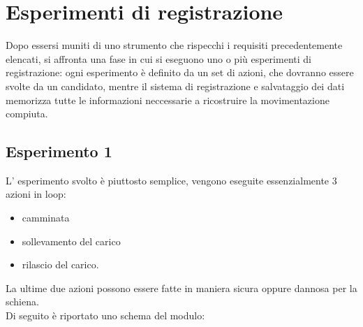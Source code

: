 \documentclass[a4paper, oneside]{book}
\begin{document}
	\section{Esperimenti di registrazione}
Dopo essersi muniti di uno strumento che rispecchi i requisiti precedentemente elencati, si  affronta una fase in cui si eseguono uno o più esperimenti di registrazione: ogni esperimento è definito da un set di azioni, che dovranno essere svolte da un candidato, mentre il sistema di registrazione e salvataggio dei dati memorizza tutte le informazioni neccessarie a ricostruire la movimentazione compiuta.

	\subsection{Esperimento 1}
L' esperimento svolto è piuttosto semplice, vengono eseguite essenzialmente 3 azioni in loop:
\begin {itemize}
\item camminata
\item sollevamento del carico 
\item rilascio del carico.
\end{itemize}
La ultime due azioni possono essere fatte in maniera sicura oppure dannosa per la schiena. \\
Di seguito è riportato uno schema del modulo:\\
\end{document}
